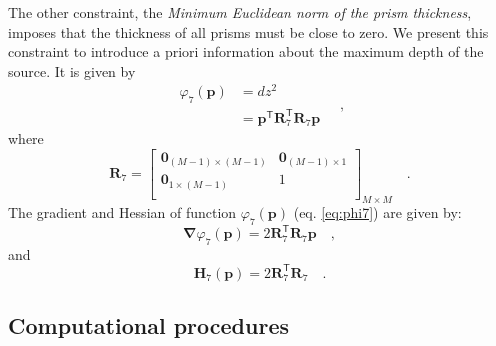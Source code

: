 The other constraint, the \textit{Minimum Euclidean norm of the prism thickness}, imposes that the thickness of all prisms must be close to zero. We present this constraint to introduce a priori information about the maximum depth of the source. It is given by
\begin{equation}\label{eq:phi7}
\begin{split}
\varphi_{7}(\mathbf{p}) &= dz^2 \\
&= \mathbf{p}^{\mathsf{T}} \mathbf{R}_{7}^{\mathsf{T}} \mathbf{R}_{7} \mathbf{p}
\end{split} \quad ,
\end{equation}
where
\begin{equation}
\mathbf{R}_{7} =
\begin{bmatrix}
\mathbf{0}_{(M-1) \times (M-1)} & \mathbf{0}_{(M-1) \times 1} \\
\mathbf{0}_{1 \times (M-1)} & 1 \\
\end{bmatrix}_{ M \times M } \quad .
\end{equation}
The gradient and Hessian of function $\varphi_{7}(\mathbf{p})$ (eq. \ref{eq:phi7}) are given by:
\begin{equation}\label{eq:phi7_grad}
\boldsymbol{\nabla}\varphi_{7}(\mathbf{p}) = 2 \mathbf{R}_{7}^{\mathsf{T}} \mathbf{R}_{7} \mathbf{p} \quad ,
\end{equation}
and
\begin{equation}\label{eq:phi7_hessian}
\mathbf{H}_{7}(\mathbf{p}) = 2 \mathbf{R}^{\mathsf{T}}_{7}\mathbf{R}_{7} \quad .
\end{equation}

\subsection{Computational procedures}

